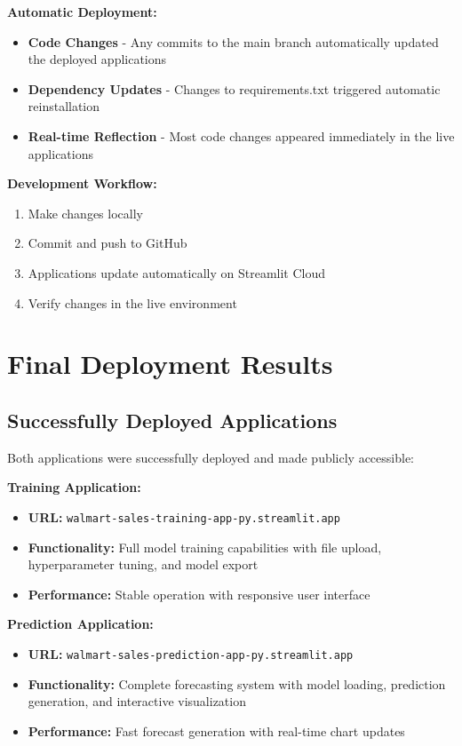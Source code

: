\textbf{Automatic Deployment:}
\begin{itemize}
\item \textbf{Code Changes} - Any commits to the main branch automatically updated the deployed applications
\item \textbf{Dependency Updates} - Changes to requirements.txt triggered automatic reinstallation
\item \textbf{Real-time Reflection} - Most code changes appeared immediately in the live applications
\end{itemize}

\textbf{Development Workflow:}
\begin{enumerate}
\item Make changes locally
\item Commit and push to GitHub
\item Applications update automatically on Streamlit Cloud
\item Verify changes in the live environment
\end{enumerate}

\section{Final Deployment Results}

\subsection{Successfully Deployed Applications}

Both applications were successfully deployed and made publicly accessible:

\textbf{Training Application:}
\begin{itemize}
\item \textbf{URL:} \texttt{walmart-sales-training-app-py.streamlit.app}
\item \textbf{Functionality:} Full model training capabilities with file upload, hyperparameter tuning, and model export
\item \textbf{Performance:} Stable operation with responsive user interface
\end{itemize}

\textbf{Prediction Application:}
\begin{itemize}
\item \textbf{URL:} \texttt{walmart-sales-prediction-app-py.streamlit.app}
\item \textbf{Functionality:} Complete forecasting system with model loading, prediction generation, and interactive visualization
\item \textbf{Performance:} Fast forecast generation with real-time chart updates
\end{itemize}

